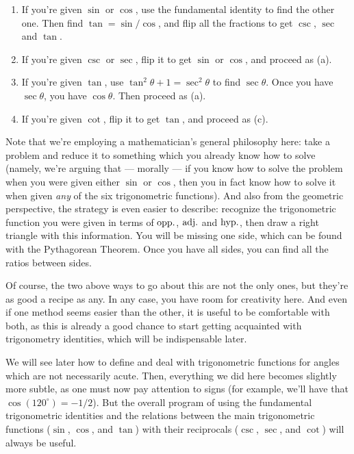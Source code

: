 \documentclass{ximera}
\begin{document}
\begin{enumerate}
\item If you're given $\sin$ or $\cos$, use the fundamental identity to find the other one. Then find $\tan=\sin/\cos$, and flip all the fractions to get $\csc$, $\sec$ and $\tan$.
\item If you're given $\csc$ or $\sec$, flip it to get $\sin$ or $\cos$, and proceed as (a).
\item If you're given $\tan$, use $\tan^2\theta+1=\sec^2\theta$ to find $\sec\theta$. Once you have $\sec\theta$, you have $\cos\theta$. Then proceed as (a).
\item If you're given $\cot$, flip it to get $\tan$, and proceed as (c).
\end{enumerate}

Note that we're employing a mathematician's general philosophy here: take a problem and reduce it to something which you already know how to solve (namely, we're arguing that --- morally --- if you know how to solve the problem when you were given either $\sin$ or $\cos$, then you in fact know how to solve it when given \emph{any} of the six trigonometric functions). And also from the geometric perspective, the strategy is even easier to describe: recognize the trigonometric function you were given in terms of ${\rm opp.}$, ${\rm adj.}$ and ${\rm hyp.}$, then draw a right triangle with this information. You will be missing one side, which can be found with the Pythagorean Theorem. Once you have all sides, you can find all the ratios between sides.

Of course, the two above ways to go about this are not the only ones, but they're as good a recipe as any. In any case, you have room for creativity here. And even if one method seems easier than the other, it is useful to be comfortable with both, as this is already a good chance to start getting acquainted with trigonometry identities, which will be indispensable later.

We will see later how to define and deal with trigonometric functions for angles which are not necessarily acute. Then, everything we did here becomes slightly more subtle, as one must now pay attention to signs (for example, we'll have that $\cos(120^\circ) = -1/2$). But the overall program of using the fundamental trigonometric identities and the relations between the main trigonometric functions ($\sin$, $\cos$, and $\tan$) with their reciprocals ($\csc$, $\sec$, and $\cot$) will always be useful.


\end{document}
